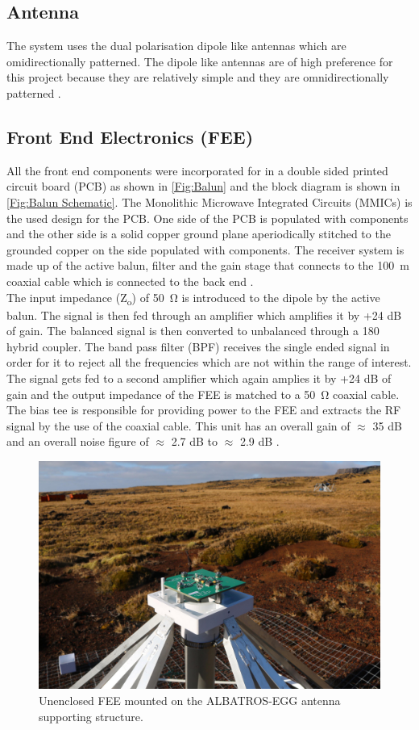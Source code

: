 \documentclass{ws-jai}
\begin{document}
\subsection{Antenna}	
The system uses the dual polarisation dipole like antennas which are omidirectionally patterned. The dipole like antennas are of high preference for this project because they are relatively simple and they are omnidirectionally patterned \cite{Memo28}.

\subsection{Front End Electronics (FEE)}
All the front end components were incorporated for in a double sided printed circuit board (PCB) as shown in \autoref{Fig:Balun} and the block diagram is shown in \autoref{Fig:Balun Schematic}. The Monolithic Microwave Integrated Circuits (MMICs) is the used design for the PCB. One side of the PCB is populated with components and the other side is a solid copper ground plane aperiodically stitched to the grounded copper on the side populated with components. The receiver system is made up of the active balun, filter and the gain stage that connects to the \SI{100}{m} coaxial cable which is connected to the back end \cite{2012PASP..124.1090H}.\\ 
The input impedance (Z\textsubscript{o}) of \SI{50}{\ohm} is introduced to the dipole by the active balun. The signal is then fed through an amplifier which amplifies it by +24 dB of gain. The balanced signal is then converted to unbalanced through a 180 \degree hybrid coupler. The band pass filter (BPF) receives the single ended signal in order for it to reject all the frequencies which are not within the range of interest. The signal gets fed to a second amplifier which again amplies it by +24 dB of gain and the output impedance of the FEE is matched to a \SI{50}{\ohm} coaxial cable. The bias tee is responsible for providing power to the FEE and extracts the RF signal by the use of the coaxial cable. This unit has an overall gain of $\approx$ 35 dB and an overall noise figure of $\approx$ 2.7 dB to $\approx$ 2.9 dB \cite{Memo35}.

\begin{figure}[h]
	\begin{center}
		\includegraphics[width=0.5\linewidth]{Figures/balun.jpg}
		\caption{Unenclosed FEE mounted on the ALBATROS-EGG antenna supporting structure.} 
		\label{Fig:Balun}
	\end{center}
\end{figure}
\end{document}
